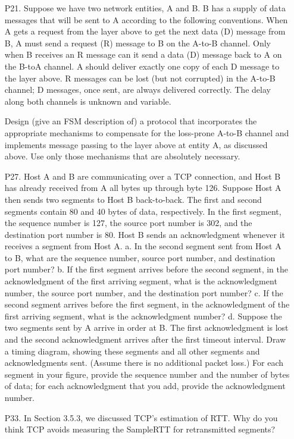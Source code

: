 \documentclass[]{article}
\begin{document}
\begin{enumerate}
	\item[P21.] Suppose we have two network entities, A and B. B has a supply of data messages that will be sent to A according to the following conventions. When A	gets a request from the layer above to get the next data (D) message from B, A must send a request (R) message to B on the A-to-B channel. Only when B	receives an R message can it send a data (D) message back to A on the B-toA channel. A should deliver exactly one copy of each D message to the layer	above. R messages can be lost (but not corrupted) in the A-to-B channel; D	messages, once sent, are always delivered correctly. The delay along both channels is unknown and variable. 
	
	Design (give an FSM description of) a protocol that incorporates the appropriate mechanisms to compensate for the loss-prone A-to-B channel and implements message passing to the layer above at entity A, as discussed above. Use only those mechanisms that are absolutely necessary.
	
	\item[P27.] Host A and B are communicating over a TCP connection, and Host B has already received from A all bytes up through byte 126. Suppose Host A then sends two segments to Host B back-to-back. The first and second segments	contain 80 and 40 bytes of data, respectively. In the first segment, the sequence number is 127, the source port number is 302, and the destination	port number is 80. Host B sends an acknowledgment whenever it receives a segment from Host A.
	\subitem a. In the second segment sent from Host A to B, what are the sequence number, source port number, and destination port number?
	\subitem b. If the first segment arrives before the second segment, in the acknowledgment of the first arriving segment, what is the acknowledgment number,
	the source port number, and the destination port number?
	\subitem c. If the second segment arrives before the first segment, in the acknowledgment of the first arriving segment, what is the acknowledgment
	number?
	\subitem d. Suppose the two segments sent by A arrive in order at B. The first acknowledgment is lost and the second acknowledgment arrives after the first timeout interval. Draw a timing diagram, showing these segments and all other segments and acknowledgments sent. (Assume there is no additional packet loss.) For each segment in your figure, provide the sequence number and	the number of bytes of data; for each acknowledgment that you add, provide the acknowledgment number.
	
	\item[P33.] In Section 3.5.3, we discussed TCP’s estimation of RTT. Why do you think TCP avoids measuring the SampleRTT for retransmitted segments?
\end{enumerate}
\end{document}
